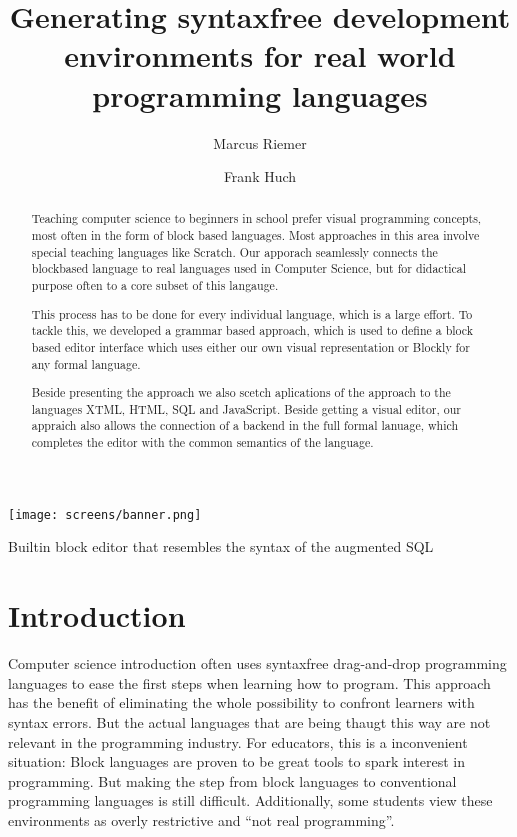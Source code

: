 \documentclass[sigconf,natbib=false,review=true]{acmart}
\begin{document}
\title[]{Generating syntaxfree development environments for real world programming languages}

\author{Marcus Riemer}

\author{Frank Huch}

\begin{abstract}
  Teaching computer science to beginners in school prefer visual programming concepts, most often in the form of block based languages. Most approaches in this area involve special teaching languages like Scratch. Our apporach seamlessly connects the blockbased language to real languages used in Computer Science, but for didactical purpose often to a core subset of this langauge.

  This process has to be done for every individual language, which is a large effort. To tackle this, we developed a grammar based approach, which is used to define a block based editor interface which uses either our own visual representation or Blockly for any formal language.

  Beside presenting the approach we also scetch aplications of the approach to the languages XTML, HTML, SQL and JavaScript. Beside getting a visual editor, our appraich also allows the connection of a backend in the full formal lanuage, which completes the editor with the common semantics of the language.
\end{abstract}

\begin{teaserfigure}
  \texttt{[image: screens/banner.png]}
  \caption{Builtin block editor that resembles the syntax of the augmented SQL}
  \label{fig:banner}
\end{teaserfigure}

\maketitle

\section{Introduction}

Computer science introduction often uses syntaxfree drag-and-drop programming languages to ease the first steps when learning how to program. This approach has the benefit of eliminating the whole possibility to confront learners with syntax errors. But the actual languages that are being thaugt this way are not relevant in the programming industry. For educators, this is a inconvenient situation: Block languages are proven to be great tools to spark interest in programming. But making the step from block languages to conventional programming languages is still difficult. Additionally, some students view these environments as overly restrictive and \enquote{not real programming}\cite{braune_learning_2020}.
\end{document}
